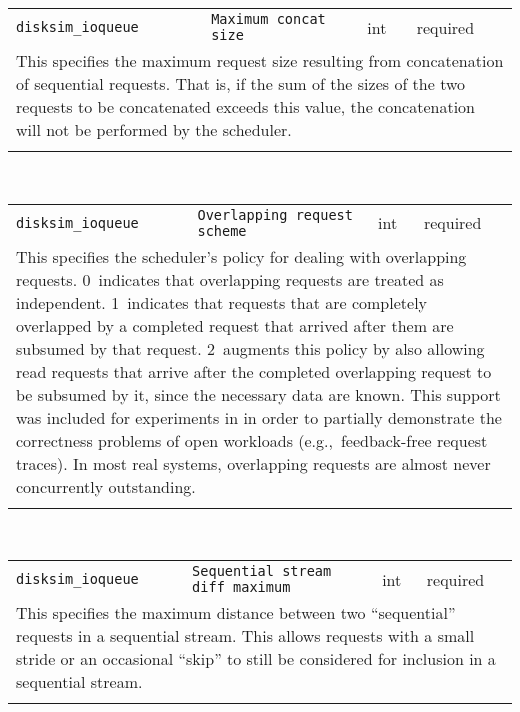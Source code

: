 \noindent 
\begin{tabular}{|p{1.5in}|p{3.5in}|p{0.5in}|p{0.5in}|}
\cline{1-4}
\texttt{disksim\_ioqueue} & \texttt{Maximum concat size} & int & required \\ 
\cline{1-4}
\multicolumn{4}{|p{6in}|}{
This specifies the maximum request size resulting from concatenation of
sequential requests. That is, if the sum of the sizes of the two
requests to be concatenated exceeds this value, the concatenation will
not be performed by the scheduler.
}\\ 
\cline{1-4}
\multicolumn{4}{p{5in}}{}\\
\end{tabular}\\ 
\noindent 
\begin{tabular}{|p{1.5in}|p{3.5in}|p{0.5in}|p{0.5in}|}
\cline{1-4}
\texttt{disksim\_ioqueue} & \texttt{Overlapping request scheme} & int & required \\ 
\cline{1-4}
\multicolumn{4}{|p{6in}|}{
This specifies the scheduler's policy for dealing with overlapping
requests.
0~indicates that overlapping requests are treated as independent.
1~indicates that requests that are completely overlapped by a
completed request that arrived after them are subsumed by that
request.
2~augments this policy by also allowing read requests that arrive
after the completed overlapping request to be subsumed by it, since
the necessary data are known. This support was included for
experiments in \cite{Ganger95} in order to partially demonstrate the
correctness problems of open workloads (e.g.,~feedback-free request
traces). In most real systems, overlapping requests are almost never
concurrently outstanding.
}\\ 
\cline{1-4}
\multicolumn{4}{p{5in}}{}\\
\end{tabular}\\ 
\noindent 
\begin{tabular}{|p{1.5in}|p{3.5in}|p{0.5in}|p{0.5in}|}
\cline{1-4}
\texttt{disksim\_ioqueue} & \texttt{Sequential stream diff maximum} & int & required \\ 
\cline{1-4}
\multicolumn{4}{|p{6in}|}{
This specifies the maximum distance between two ``sequential'' requests in
a sequential stream. This allows requests with a small stride or an
occasional ``skip'' to still be considered for inclusion in a
sequential stream.
}\\ 
\cline{1-4}
\multicolumn{4}{p{5in}}{}\\
\end{tabular}\\ 

